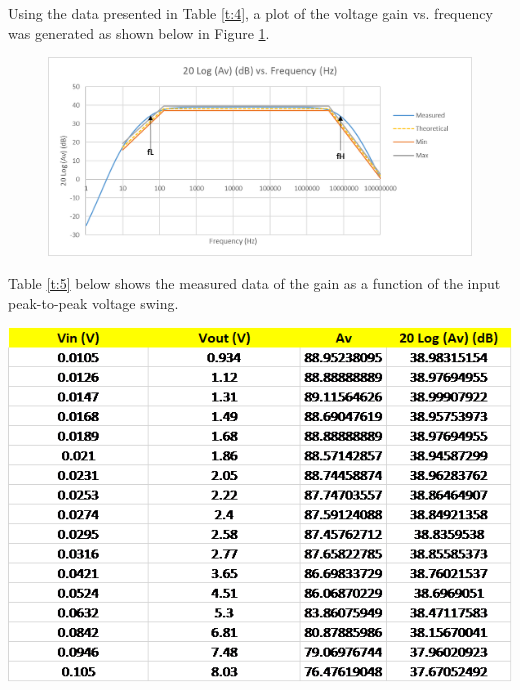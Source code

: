 \documentclass{article}
\begin{document}
	\pagebreak
	\noindent Using the data presented in Table \ref{t:4}, a plot of the voltage gain vs. frequency was generated as shown below in Figure \ref{f:2}.
	\begin{figure}[!ht]
		\centering
		\includegraphics[width=0.7\textheight]{gain_vs_freq.png}
		\label{f:2}
	\end{figure}
	
	Table \ref{t:5} below shows the measured data of the gain as a function of the input peak-to-peak voltage swing.
	\begin{table}[!ht]
		\centering
		\includegraphics[width=0.8\linewidth]{data_gain_vs_in.png}
		\label{t:5}
	\end{table}
	
\end{document}
